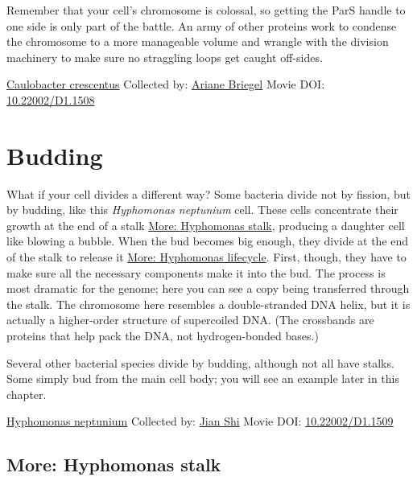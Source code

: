 \documentclass[]{tufte-book}
\begin{document}
Remember that your cell's chromosome is colossal, so getting the ParS handle to one side is only part of the battle. An army of other proteins work to condense the chromosome to a more manageable volume and wrangle with the division machinery to make sure no straggling loops get caught off-sides.



\hypertarget{htmlwidget-e9278505d4d0ed6aea87}{}

\label{fig:5-2}\protect\hyperlink{tree}{Caulobacter crescentus} Collected by: \protect\hyperlink{ariane_briegel}{Ariane Briegel} Movie DOI: \href{https://doi.org/10.22002/D1.1508}{10.22002/D1.1508}

\hypertarget{budding}{%
\section{Budding}\label{budding}}

What if your cell divides a different way? Some bacteria divide not by fission, but by budding, like this \emph{Hyphomonas neptunium} cell. These cells concentrate their growth at the end of a stalk \protect\hyperlink{Hyphomonas_stalk}{More: Hyphomonas stalk}, producing a daughter cell like blowing a bubble. When the bud becomes big enough, they divide at the end of the stalk to release it \protect\hyperlink{Hyphomonas_lifecycle}{More: Hyphomonas lifecycle}. First, though, they have to make sure all the necessary components make it into the bud. The process is most dramatic for the genome; here you can see a copy being transferred through the stalk. The chromosome here resembles a double-stranded DNA helix, but it is actually a higher-order structure of supercoiled DNA. (The crossbands are proteins that help pack the DNA, not hydrogen-bonded bases.)

Several other bacterial species divide by budding, although not all have stalks. Some simply bud from the main cell body; you will see an example later in this chapter.



\hypertarget{htmlwidget-cfba711647907f8828bf}{}

\label{fig:5-3}\protect\hyperlink{tree}{Hyphomonas neptunium} Collected by: \protect\hyperlink{jian_shi}{Jian Shi} Movie DOI: \href{https://doi.org/10.22002/D1.1509}{10.22002/D1.1509}

\hypertarget{Hyphomonas_stalk}{%
\subsection*{More: Hyphomonas stalk}\label{Hyphomonas_stalk}}
\end{document}
